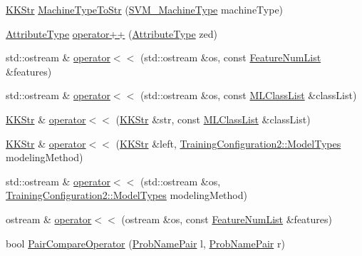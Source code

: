 \begin{DoxyCompactItemize}
\item 
\hyperlink{class_k_k_b_1_1_k_k_str}{K\+K\+Str} \hyperlink{namespace_k_k_m_l_l_ae41cf90293bf19b13fbeeb4dcefa09eb}{Machine\+Type\+To\+Str} (\hyperlink{namespace_k_k_m_l_l_ad917464bc631109a3021cf02cd27af9a}{S\+V\+M\+\_\+\+Machine\+Type} machine\+Type)
\item 
\hyperlink{namespace_k_k_m_l_l_a99973706982b59debba670e2480555ab}{Attribute\+Type} \hyperlink{namespace_k_k_m_l_l_a1bbde1cf6a543227a872a866a75b62ac}{operator++} (\hyperlink{namespace_k_k_m_l_l_a99973706982b59debba670e2480555ab}{Attribute\+Type} zed)
\item 
std\+::ostream \& \hyperlink{namespace_k_k_m_l_l_a60ad19605403fb1416f1431cfecb1fab}{operator$<$$<$} (std\+::ostream \&os, const \hyperlink{class_k_k_m_l_l_1_1_feature_num_list}{Feature\+Num\+List} \&features)
\item 
std\+::ostream \& \hyperlink{namespace_k_k_m_l_l_a31fb7b9c89a89a599da68feacd9072f7}{operator$<$$<$} (std\+::ostream \&os, const \hyperlink{class_k_k_m_l_l_1_1_m_l_class_list}{M\+L\+Class\+List} \&class\+List)
\item 
\hyperlink{class_k_k_b_1_1_k_k_str}{K\+K\+Str} \& \hyperlink{namespace_k_k_m_l_l_afb8eed671e2889b793c77eed51637faa}{operator$<$$<$} (\hyperlink{class_k_k_b_1_1_k_k_str}{K\+K\+Str} \&str, const \hyperlink{class_k_k_m_l_l_1_1_m_l_class_list}{M\+L\+Class\+List} \&class\+List)
\item 
\hyperlink{class_k_k_b_1_1_k_k_str}{K\+K\+Str} \& \hyperlink{namespace_k_k_m_l_l_a4d62bea3df753c817d65e4ff7f6bef7b}{operator$<$$<$} (\hyperlink{class_k_k_b_1_1_k_k_str}{K\+K\+Str} \&left, \hyperlink{class_k_k_m_l_l_1_1_model_aeda4060e088c67446ca993eefcecea06}{Training\+Configuration2\+::\+Model\+Types} modeling\+Method)
\item 
std\+::ostream \& \hyperlink{namespace_k_k_m_l_l_a66b0f120bba00e2473eb22def7043ffa}{operator$<$$<$} (std\+::ostream \&os, \hyperlink{class_k_k_m_l_l_1_1_model_aeda4060e088c67446ca993eefcecea06}{Training\+Configuration2\+::\+Model\+Types} modeling\+Method)
\item 
ostream \& \hyperlink{namespace_k_k_m_l_l_a3f15ffe4d30202e436a55ad8dbf2004f}{operator$<$$<$} (ostream \&os, const \hyperlink{class_k_k_m_l_l_1_1_feature_num_list}{Feature\+Num\+List} \&features)
\item 
bool \hyperlink{namespace_k_k_m_l_l_aed4f24e07be0cb219051de190df720b4}{Pair\+Compare\+Operator} (\hyperlink{class_k_k_m_l_l_1_1_prob_name_pair}{Prob\+Name\+Pair} l, \hyperlink{class_k_k_m_l_l_1_1_prob_name_pair}{Prob\+Name\+Pair} r)

\end{DoxyCompactItemize}
